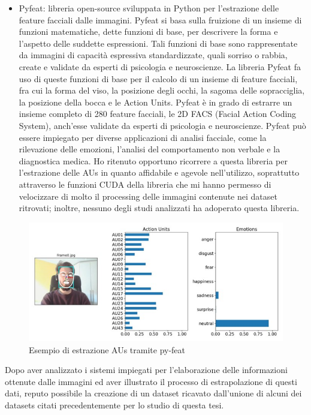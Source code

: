 \begin{itemize}
    \item Pyfeat: libreria open-source sviluppata in Python per l'estrazione delle feature facciali dalle immagini. Pyfeat si basa sulla fruizione di un insieme di funzioni matematiche, dette funzioni di base, per descrivere la forma e l'aspetto delle suddette espressioni. Tali funzioni di base sono rappresentate da immagini di capacità espressiva standardizzate, quali sorriso o rabbia, create e validate da esperti di psicologia e neuroscienze. La libreria Pyfeat fa uso di queste funzioni di base per il calcolo di un insieme di feature facciali, fra cui la forma del viso, la posizione degli occhi, la sagoma delle sopracciglia, la posizione della bocca e le Action Units. Pyfeat è in grado di estrarre un insieme completo di 280 feature facciali, le 2D FACS (Facial Action Coding System), anch’esse validate da esperti di psicologia e neuroscienze. Pyfeat può essere impiegato per diverse applicazioni di analisi facciale, come la rilevazione delle emozioni, l'analisi del comportamento non verbale e la diagnostica medica. Ho ritenuto opportuno ricorrere a questa libreria per l’estrazione delle AUs in quanto affidabile e agevole nell’utilizzo, soprattutto attraverso le funzioni CUDA della libreria che mi hanno permesso di velocizzare di molto il processing delle immagini contenute nei dataset ritrovati; inoltre, nessuno degli studi analizzati ha adoperato questa libreria. 
\end{itemize}

\begin{figure}
    \begin{center}    
        \includegraphics[width=1\linewidth]{images/13.jpg}
        \caption{Esempio di estrazione AUs tramite py-feat}
    \end{center}
\end{figure}

Dopo aver analizzato i sistemi impiegati per l’elaborazione delle informazioni ottenute dalle immagini ed aver illustrato il processo di estrapolazione di questi dati, reputo possibile la creazione di un dataset ricavato dall’unione di alcuni dei datasets citati precedentemente per lo studio di questa tesi.

